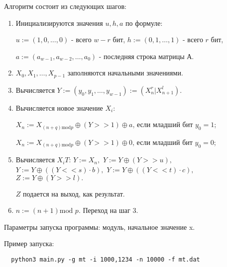 \documentclass[spec, och, labwork]{shiza}
\begin{document}
Алгоритм состоит из следующих шагов:
\begin{enumerate}
  \item Инициализируются значения $u, h, a$ по формуле:

  $u:=(1,0,\dots,0)$ - всего $w-r$ бит, 
  \newline $h:=(0,1,\dots,1)$ - всего $r$ бит,

  $a:=(a_{w-1}, a_{w-2}, \dots, a_0)$ - последняя строка матрицы $А$.
  \item $X_0, X_1, \dots, X_{p-1}$ заполняются начальными значениями.
  \item Вычисляется $Y:=(y_0, y_1, \dots, y_{w-1}):=(X^r_n | X^l_{n+1})$.
  \item Вычисляется новое значение $X_i$:
  
  $X_n := X_{(n+q) \text{mod} p} \oplus (Y >> 1) \oplus a$, если младший бит $y_0=1$;

  $X_n := X_{(n+q) \text{mod} p} \oplus (Y >> 1) \oplus 0$, если младший бит $y_0=0$;
  \item Вычисляется $X_iT$:
  \newline$Y:=X_n, $
  \newline$Y:=Y \oplus (Y >> u), $
  \newline$Y:=Y \oplus ((Y << s) \cdot b),$
  \newline$Y:=Y \oplus ((Y << t) \cdot c), $
  \newline$Z:=Y \oplus (Y >> l).$

  $Z$ подается на выход, как результат.
  \item $n:=(n+1) \text{mod } p$. Переход на шаг 3.
\end{enumerate}


Параметры запуска программы: модуль, начальное значение x.

Пример запуска:
\begin{small}
\begin{verbatim}
  python3 main.py -g mt -i 1000,1234 -n 10000 -f mt.dat
 \end{verbatim}
\end{small}
\end{document}
